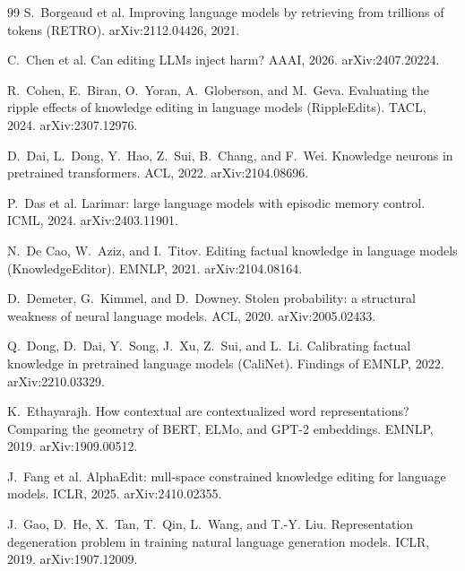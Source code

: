 \documentclass[10pt,twocolumn]{article}
\theoremstyle{remark}
\begin{document}
\begin{thebibliography}{99}
\small
{}
S.~Borgeaud et al.
\newblock Improving language models by retrieving from trillions of tokens (RETRO).
\newblock arXiv:2112.04426, 2021.

C.~Chen et al.
\newblock Can editing LLMs inject harm?
\newblock AAAI, 2026. arXiv:2407.20224.

R.~Cohen, E.~Biran, O.~Yoran, A.~Globerson, and M.~Geva.
\newblock Evaluating the ripple effects of knowledge editing in language models (RippleEdits).
\newblock TACL, 2024. arXiv:2307.12976.

D.~Dai, L.~Dong, Y.~Hao, Z.~Sui, B.~Chang, and F.~Wei.
\newblock Knowledge neurons in pretrained transformers.
\newblock ACL, 2022. arXiv:2104.08696.

P.~Das et al.
\newblock Larimar: large language models with episodic memory control.
\newblock ICML, 2024. arXiv:2403.11901.

N.~De Cao, W.~Aziz, and I.~Titov.
\newblock Editing factual knowledge in language models (KnowledgeEditor).
\newblock EMNLP, 2021. arXiv:2104.08164.

D.~Demeter, G.~Kimmel, and D.~Downey.
\newblock Stolen probability: a structural weakness of neural language models.
\newblock ACL, 2020. arXiv:2005.02433.

Q.~Dong, D.~Dai, Y.~Song, J.~Xu, Z.~Sui, and L.~Li.
\newblock Calibrating factual knowledge in pretrained language models (CaliNet).
\newblock Findings of EMNLP, 2022. arXiv:2210.03329.

K.~Ethayarajh.
\newblock How contextual are contextualized word representations? Comparing the geometry of BERT, ELMo, and GPT-2 embeddings.
\newblock EMNLP, 2019. arXiv:1909.00512.

J.~Fang et al.
\newblock AlphaEdit: null-space constrained knowledge editing for language models.
\newblock ICLR, 2025. arXiv:2410.02355.

J.~Gao, D.~He, X.~Tan, T.~Qin, L.~Wang, and T.-Y. Liu.
\newblock Representation degeneration problem in training natural language generation models.
\newblock ICLR, 2019. arXiv:1907.12009.


\end{thebibliography}
\end{document}

